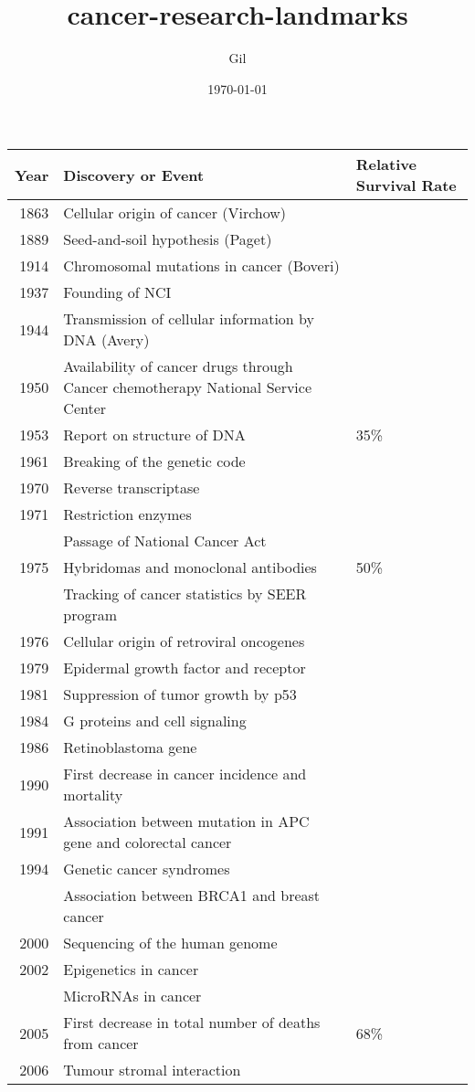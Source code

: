 \documentclass[11pt]{article}
\author{Gil}
\date{\today}
\title{cancer-research-landmarks}
\begin{document}
\maketitle
\tableofcontents

\begin{center}
\begin{tabular}{rll}
Year & Discovery or Event & Relative Survival Rate\\
\hline
1863 & Cellular origin of cancer (Virchow) & \\
1889 & Seed-and-soil hypothesis (Paget) & \\
1914 & Chromosomal mutations in cancer (Boveri) & \\
1937 & Founding of NCI & \\
1944 & Transmission of cellular information by DNA (Avery) & \\
1950 & Availability of cancer drugs through Cancer chemotherapy National Service Center & \\
1953 & Report on structure of DNA & 35\%\\
1961 & Breaking of the genetic code & \\
1970 & Reverse transcriptase & \\
1971 & Restriction enzymes & \\
 & Passage of National Cancer Act & \\
1975 & Hybridomas and monoclonal antibodies & 50\%\\
 & Tracking of cancer statistics by SEER program & \\
1976 & Cellular origin of retroviral oncogenes & \\
1979 & Epidermal growth factor and receptor & \\
1981 & Suppression of tumor growth by p53 & \\
1984 & G proteins and cell signaling & \\
1986 & Retinoblastoma gene & \\
1990 & First decrease in cancer incidence and mortality & \\
1991 & Association between mutation in APC gene and colorectal cancer & \\
1994 & Genetic cancer syndromes & \\
 & Association between BRCA1 and breast cancer & \\
2000 & Sequencing of the human genome & \\
2002 & Epigenetics in cancer & \\
 & MicroRNAs in cancer & \\
2005 & First decrease in total number of deaths from cancer & 68\%\\
2006 & Tumour stromal interaction & \\
\end{tabular}
\end{center}
\end{document}
